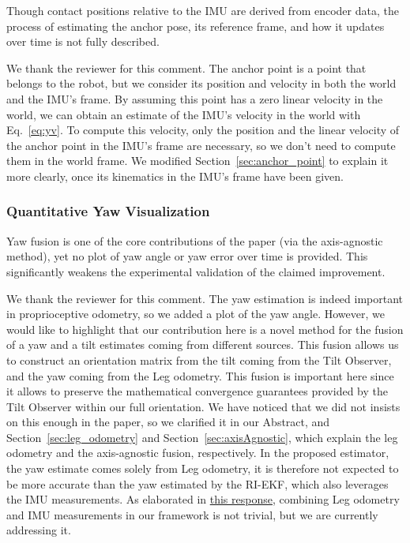 \begin{revquote}
Though contact positions relative to the IMU are derived from encoder data, the process of estimating the anchor pose, its reference frame, and how it updates over time is not fully described.
\end{revquote}

We thank the reviewer for this comment. The anchor point is a point that belongs to the robot, but we consider its position and velocity in both the world and the IMU's frame. By assuming this point has a zero linear velocity in the world, we can obtain an estimate of the IMU's velocity in the world with Eq.~\eqref{eq:yv}. To compute this velocity, only the position and the linear velocity of the anchor point in the IMU's frame are necessary, so we don't need to compute them in the world frame. We modified Section~\ref{sec:anchor_point} to explain it more clearly, once its kinematics in the IMU's frame have been given.

\subsubsection{Quantitative Yaw Visualization}

\begin{revquote}
Yaw fusion is one of the core contributions of the paper (via the axis-agnostic method), yet no plot of yaw angle or yaw error over time is provided. This significantly weakens the experimental validation of the claimed improvement.
\end{revquote}

We thank the reviewer for this comment. The yaw estimation is indeed important in proprioceptive odometry, so we added a plot of the yaw angle. 
However, we would like to highlight that our contribution here is a novel method for the fusion of a yaw and a tilt estimates coming from different sources. 
This fusion allows us to construct an orientation matrix from the tilt coming from the Tilt Observer, and the yaw coming from the Leg odometry. 
This fusion is important here since it allows to preserve the mathematical convergence guarantees provided by the Tilt Observer within our full orientation. 
We have noticed that we did not insists on this enough in the paper, so we clarified it in our Abstract, and Section~\ref{sec:leg_odometry} and Section~\ref{sec:axisAgnostic}, which explain the leg odometry and the axis-agnostic fusion, respectively.
In the proposed estimator, the yaw estimate comes solely from Leg odometry, it is therefore not expected to be more accurate than the yaw estimated by the RI-EKF, which also leverages the IMU measurements. As elaborated in \hyperlink{CommentSe3Fusion}{this response}, combining Leg odometry and IMU measurements in our framework is not trivial, but we are currently addressing it.

